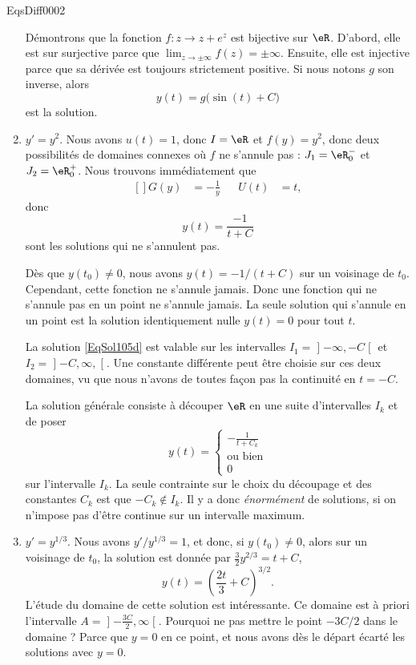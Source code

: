 \begin{corrige}{EqsDiff0002}
\begin{enumerate}
Démontrons que la fonction $f\colon z\to z+e^z$ est bijective sur $\eR$. D'abord, elle est sur surjective parce que $\lim_{z\to \pm\infty} f(z)=\pm\infty$. Ensuite, elle est injective parce que sa dérivée est toujours strictement positive. Si nous notons $g$ son inverse, alors
\begin{equation}
	y(t)=g\big( \sin(t)+C \big)
\end{equation}
est la solution.

\item
$y'=y^2$. Nous avons $u(t)=1$, donc $I=\eR$ et $f(y)=y^2$, donc deux possibilités de domaines connexes où $f$ ne s'annule pas : $J_1=\eR_0^-$ et $J_2=\eR_0^+$. Nous trouvons immédiatement que
\begin{equation}
	\begin{aligned}[]
		G(y)&=-\frac{1}{ y }&&U(t)&=t,
	\end{aligned}
\end{equation}
donc
\begin{equation}		\label{EqSol105d}
	y(t)=\frac{ -1 }{ t+C }
\end{equation}
sont les solutions qui ne s'annulent pas.

Dès que $y(t_0)\neq 0$, nous avons $y(t)=-1/(t+C)$ sur un voisinage de $t_0$. Cependant, cette fonction ne s'annule jamais. Donc une fonction qui ne s'annule pas en un point ne s'annule jamais. La seule solution qui s'annule en un point est la solution identiquement nulle $y(t)=0$ pour tout $t$.

La solution \eqref{EqSol105d} est valable sur les intervalles $I_1=\mathopen]-\infty,-C\mathclose[$ et $I_2=\mathopen]-C,\infty,\mathclose[$. Une constante différente peut être choisie sur ces deux domaines, vu que nous n'avons de toutes façon pas la continuité en $t=-C$. 

La solution générale consiste à découper $\eR$ en une suite d'intervalles $I_k$ et de poser
\begin{equation}
	y(t)=\begin{cases}
	-\frac{ 1 }{ t+C_k }	\\
	\text{ou bien}\\
	0	
\end{cases}
\end{equation}
sur l'intervalle $I_k$. La seule contrainte sur le choix du découpage et des constantes $C_k$ est que $-C_k\notin I_k$. Il y a donc \emph{énormément} de solutions, si on n'impose pas d'être continue sur un intervalle maximum.

\item
$y'=y^{1/3}$. Nous avons $y'/y^{1/3}=1$, et donc, si $y(t_0)\neq 0$, alors sur un voisinage de $t_0$, la solution est donnée par $\frac{ 3 }{ 2 }y^{2/3}=t+C$,
\begin{equation}
	y(t)=\left( \frac{ 2t }{ 3 }+C \right)^{3/2}.
\end{equation}
L'étude du domaine de cette solution est intéressante. Ce domaine est à priori l'intervalle $A=\mathopen]-\frac{ 3C }{ 2 },\infty\mathclose[$. Pourquoi ne pas mettre le point $-3C/2$ dans le domaine ? Parce que $y=0$ en ce point, et nous avons dès le départ écarté les solutions avec $y=0$. 


\end{enumerate}
\end{corrige}

